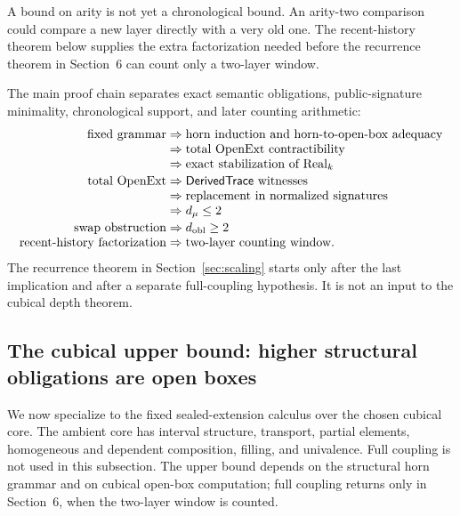 \documentclass{lmcs}
\newcommand{\Real}{\mathrm{Real}}
\newcommand{\OpenExt}{\mathrm{OpenExt}}
\begin{document}
A bound on arity is not yet a chronological bound.  An arity-two comparison could compare a
new layer directly with a very old one.  The recent-history theorem below supplies the extra
factorization needed before the recurrence theorem in Section~6 can count only a two-layer
window.

\begin{rem}
\label{rem:level-audit}
The main proof chain separates exact semantic obligations, public-signature minimality,
chronological support, and later counting arithmetic:
{\small
\[
\begin{array}{@{}r@{\;}c@{\;}l@{}}
\text{fixed grammar} &\Rightarrow& \text{horn induction and horn-to-open-box adequacy}\\
                    &\Rightarrow& \text{total \(\OpenExt\) contractibility}\\
                    &\Rightarrow& \text{exact stabilization of \(\Real_k\)}\\[0.4ex]
\text{total \(\OpenExt\)} &\Rightarrow& \mathsf{DerivedTrace}\text{ witnesses}\\
                    &\Rightarrow& \text{replacement in normalized signatures}\\
                    &\Rightarrow& d_\mu\leq 2\\[0.4ex]
\text{swap obstruction} &\Rightarrow& d_{\mathrm{obl}}\geq 2\\
\text{recent-history factorization} &\Rightarrow& \text{two-layer counting window}.
\end{array}
\]
}
The recurrence theorem in Section~\ref{sec:scaling} starts only after the last implication and
after a separate full-coupling hypothesis.  It is not an input to the cubical depth theorem.
\end{rem}


\subsection{The cubical upper bound: higher structural obligations are open boxes}
\label{subsec:cubical-upper-bound}

We now specialize to the fixed sealed-extension calculus over the chosen cubical core.  The
ambient core has interval structure, transport, partial elements, homogeneous and dependent
composition, filling, and univalence.  Full coupling is not used in this subsection.  The
upper bound depends on the structural horn grammar and on cubical open-box computation;
full coupling returns only in Section~6, when the two-layer window is counted.
\end{document}
